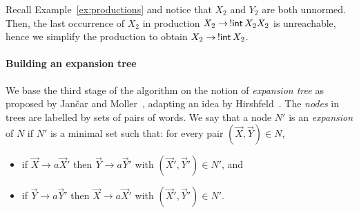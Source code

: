 
\begin{example}
  \label{ex:prune}
  Recall Example~\ref{ex:productions} and notice that $X_2$ and $Y_2$
  are both unnormed. Then, the last occurrence of $X_2$ in production
  $X_2 \rightarrow \,!\mathsf{int}\, X_2 X_2$ is unreachable, hence we
  simplify the production to obtain $X_2 \rightarrow \,!\mathsf{int}\, X_2$.
\end{example}

\paragraph{Building an expansion tree}


We base the third stage of the algorithm on the notion of
\emph{expansion tree} as proposed by Jan{\v{c}}ar and
Moller~\cite{janvcar1999techniques}, adapting an idea by
Hirshfeld~\cite{hirshfeld1996bisimulation}. The \emph{nodes} in trees
are labelled by sets of pairs of words.
%
We say that a node $N'$ is an \emph{expansion} of $N$ if $N'$ is a
minimal set such that: for every pair $(\vec X, \vec Y) \in N$,
\begin{itemize}
\item if $\vec X \rightarrow a\vec X'$ then
  $\vec Y \rightarrow a\vec Y'$ with $(\vec X',\vec Y')\in N'$, and
\item if $\vec Y \rightarrow a\vec Y'$ then
  $\vec X \rightarrow a \vec X'$ with $(\vec X',\vec Y')\in N'$.
\end{itemize}


